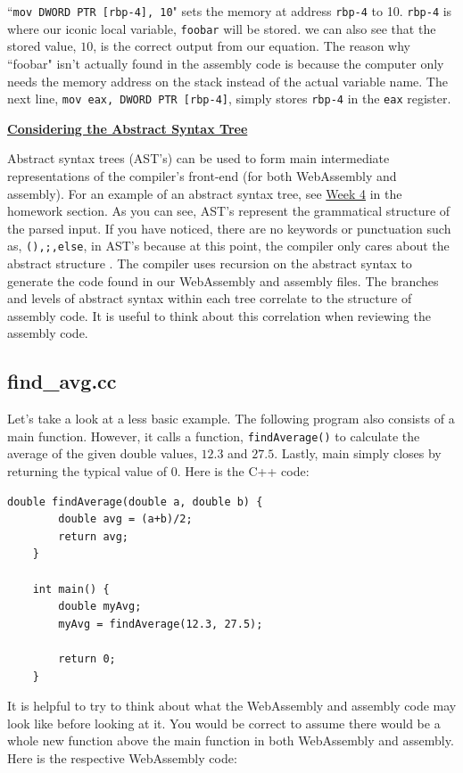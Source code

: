 \documentclass{article}
\theoremstyle{theorem}
\theoremstyle{definition}
\theoremstyle{remark}
\begin{document}
\medskip\noindent
``\verb|mov DWORD PTR [rbp-4], 10|" sets the memory at address \verb|rbp-4| to 10. \verb|rbp-4| is where our iconic local variable, \verb|foobar| will be stored. we can also see that the stored value, $10$, is the correct output from our equation. The reason why ``foobar" isn't actually found in the assembly code is because the computer only needs the memory address on the stack instead of the actual variable name. The next line, \verb|mov eax, DWORD PTR [rbp-4]|, simply stores \verb|rbp-4| in the \verb|eax| register.

\bigskip\noindent
\underline{\textbf{Considering the Abstract Syntax Tree}}

\medskip
Abstract syntax trees (AST's) can be used to form main intermediate representations of the compiler's front-end (for both WebAssembly and assembly). For an example of an abstract syntax tree, see \hyperref[sec:week4]{Week 4} in the homework section. As you can see, AST's represent the grammatical structure of the parsed input. If you have noticed, there are no keywords or punctuation such as, \verb|(),;,else|, in AST's because at this point, the compiler only cares about the abstract structure \cite{AS}. The compiler uses recursion on the abstract syntax to generate the code found in our WebAssembly and assembly files. The branches and levels of abstract syntax within each tree correlate to the structure of assembly code. It is useful to think about this correlation when reviewing the assembly code.

\subsection{find\_avg.cc}
\medskip\noindent
Let's take a look at a less basic example. The following program also consists of a main function. However, it calls a function, \verb|findAverage()| to calculate the average of the given double values, $12.3$ and $27.5$. Lastly, main simply closes by returning the typical value of 0. Here is the C++ code:

\medskip\noindent
\begin{lstlisting}[style=CStyle]
    double findAverage(double a, double b) {
        double avg = (a+b)/2;
        return avg;
    }

    int main() {
        double myAvg;
        myAvg = findAverage(12.3, 27.5);

        return 0;
    }
\end{lstlisting}

\medskip\noindent
It is helpful to try to think about what the WebAssembly and assembly code may look like before looking at it. You would be correct to assume there would be a whole new function above the main function in both WebAssembly and assembly. Here is the respective WebAssembly code:
\end{document}
